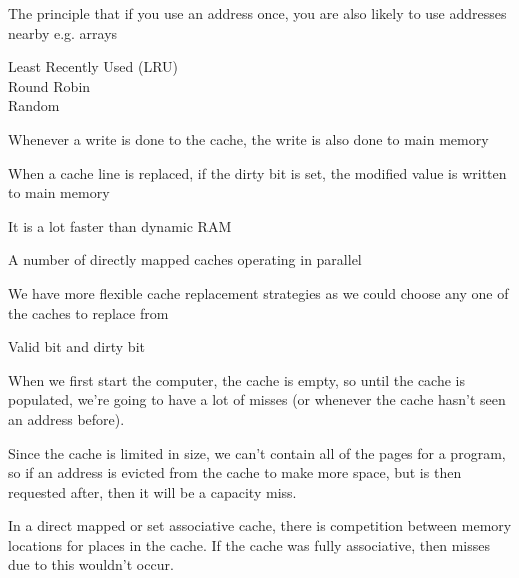 


{
  The principle that if you use an address once, you are also likely to use
  addresses nearby e.g. arrays
}

{
  Least Recently Used (LRU)\\
  Round Robin\\
  Random
}

{
  Whenever a write is done to the cache, the write is also done to main memory
}

{
  When a cache line is replaced, if the dirty bit is set, the modified value is
  written to main memory
}

{
  It is a lot faster than dynamic RAM
}


{
  A number of directly mapped caches operating in parallel
}

{
  We have more flexible cache replacement strategies as we could choose any one
  of the caches to replace from
}

{
  Valid bit and dirty bit
}

{
  When we first start the computer, the cache is empty, so until the cache is
  populated, we're going to have a lot of misses (or whenever the cache hasn't
  seen an address before).
}

{
  Since the cache is limited in size, we can’t contain all of the pages for a
  program, so if an address is evicted from the cache to make more space, but
  is then requested after, then it will be a capacity miss.
}

{
  In a direct mapped or set associative cache, there is competition between
  memory locations for places in the cache. If the cache was fully associative,
  then misses due to this wouldn’t occur.
}
